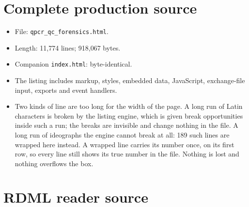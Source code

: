 \chapter{Complete production source}\label{app:source}


\begin{itemize}
\item File: \texttt{qpcr\_qc\_forensics.html}.
\item Length: 11,774 lines; 918,067 bytes.
\item Companion \texttt{index.html}: byte-identical.
\item The listing includes markup, styles, embedded data, JavaScript, exchange-file input, exports and event handlers.
\item Two kinds of line are too long for the width of the page. A long run of Latin characters is
broken by the listing engine, which is given break opportunities inside such a run; the breaks are
invisible and change nothing in the file. A long run of ideographs the engine cannot break at all:
189 such lines are wrapped here instead. A wrapped line carries its number once, on its first row,
so every line still shows its true number in the file. Nothing is lost and nothing overflows the box.
\end{itemize}



\chapter{RDML reader source}\label{app:rdml-source}


